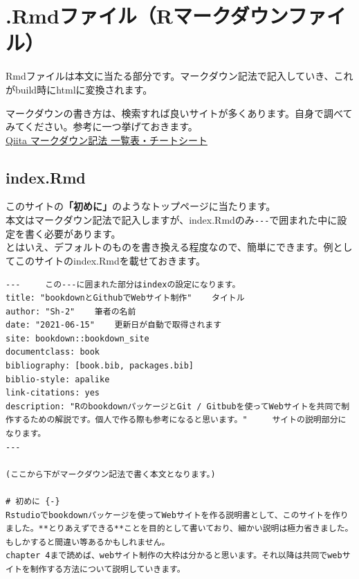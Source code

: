 \documentclass[
]{book}
\begin{document}
\hypertarget{rmdux30d5ux30a1ux30a4ux30ebrux30deux30fcux30afux30c0ux30a6ux30f3ux30d5ux30a1ux30a4ux30eb}{%
\section{.Rmdファイル（Rマークダウンファイル）}\label{rmdux30d5ux30a1ux30a4ux30ebrux30deux30fcux30afux30c0ux30a6ux30f3ux30d5ux30a1ux30a4ux30eb}}

Rmdファイルは本文に当たる部分です。マークダウン記法で記入していき、これがbuild時にhtmlに変換されます。

マークダウンの書き方は、検索すれば良いサイトが多くあります。自身で調べてみてください。参考に一つ挙げておきます。\\
\href{https://qiita.com/kamorits/items/6f342da395ad57468ae3}{Qiita マークダウン記法 一覧表・チートシート}

\hypertarget{index.rmd}{%
\subsection{index.Rmd}\label{index.rmd}}

このサイトの\textbf{「初めに」}のようなトップページに当たります。\\
本文はマークダウン記法で記入しますが、index.Rmdのみ\texttt{-\/-\/-}で囲まれた中に設定を書く必要があります。\\
とはいえ、デフォルトのものを書き換える程度なので、簡単にできます。例としてこのサイトのindex.Rmdを載せておきます。

\begin{verbatim}
---     この---に囲まれた部分はindexの設定になります。
title: "bookdownとGithubでWebサイト制作"    タイトル
author: "Sh-2"    筆者の名前
date: "2021-06-15"    更新日が自動で取得されます
site: bookdown::bookdown_site 
documentclass: book
bibliography: [book.bib, packages.bib]
biblio-style: apalike
link-citations: yes
description: "RのbookdownパッケージとGit / Gitbubを使ってWebサイトを共同で制作するための解説です。個人で作る際も参考になると思います。"     サイトの説明部分になります。
---

(ここから下がマークダウン記法で書く本文となります。)

# 初めに {-}
Rstudioでbookdownパッケージを使ってWebサイトを作る説明書として、このサイトを作りました。**とりあえずできる**ことを目的として書いており、細かい説明は極力省きました。もしかすると間違い等あるかもしれません。  
chapter 4まで読めば、webサイト制作の大枠は分かると思います。それ以降は共同でwebサイトを制作する方法について説明していきます。
\end{verbatim}
\end{document}
